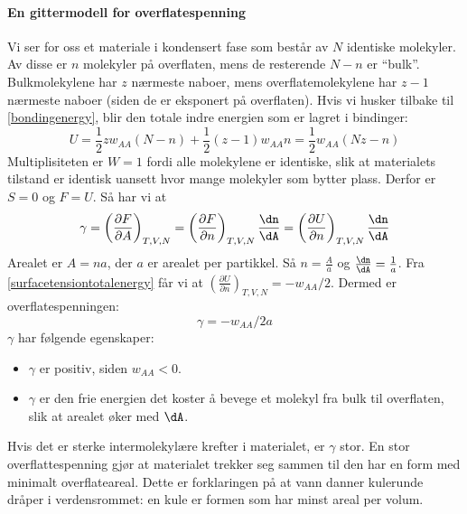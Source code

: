 \paragraph{En gittermodell for overflatespenning} Vi ser for oss et materiale i kondensert fase som består av $N$ identiske molekyler. Av disse er $n$ molekyler på overflaten, mens de resterende $N-n$ er ``bulk''. Bulkmolekylene har $z$ nærmeste naboer, mens overflatemolekylene har $z-1$ nærmeste naboer (siden de er eksponert på overflaten). Hvis vi husker tilbake til \eqref{bondingenergy}, blir den totale indre energien som er lagret i bindinger:
\begin{equation}
	\label{surfacetensiontotalenergy}
	U=\frac{1}{2}zw_{AA}(N-n)+\frac{1}{2}(z-1)w_{AA}n=\frac{1}{2}w_{AA}(Nz-n)
\end{equation}
Multiplisiteten er $W=1$ fordi alle molekylene er identiske, slik at materialets tilstand er identisk uansett hvor mange molekyler som bytter plass. Derfor er $S=0$ og $F=U$. Så har vi at 
\begin{equation}
	\gamma = \left(\frac{\partial F}{\partial A}\right)_{T,V,N} = \left(\frac{\partial F}{\partial n}\right)_{T,V,N}\frac{\dn}{\dA} = \left(\frac{\partial U}{\partial n}\right)_{T,V,N}\frac{\dn}{\dA}
\end{equation}
Arealet er $A=na$, der $a$ er arealet per partikkel. Så $n=\frac{A}{a}$ og $\frac{\dn}{\dA}=\frac{1}{a}$. Fra \eqref{surfacetensiontotalenergy} får vi at $\left(\frac{\partial U}{\partial n}\right)_{T,V,N}=-w_{AA}/2$. Dermed er overflatespenningen:
\begin{equation}
	\gamma = -w_{AA}/2a
\end{equation}
$\gamma$ har følgende egenskaper:
\begin{itemize}
	\item $\gamma$ er positiv, siden $w_{AA}<0$.
	\item $\gamma$ er den frie energien det koster å bevege et molekyl fra bulk til overflaten, slik at arealet øker med $\dA$.
\end{itemize}
Hvis det er sterke intermolekylære krefter i materialet, er $\gamma$ stor. En stor overflattespenning gjør at materialet trekker seg sammen til den har en form med minimalt overflateareal. Dette er forklaringen på at vann danner kulerunde dråper i verdensrommet: en kule er formen som har minst areal per volum.

